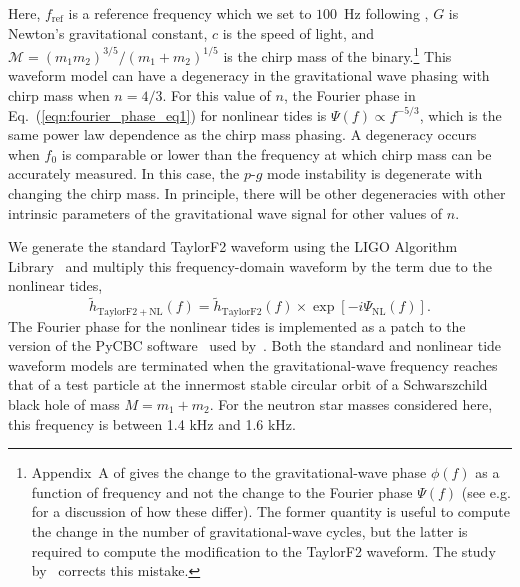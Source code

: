 Here, $f_\mathrm{ref}$ is a reference frequency which we set to $100$~Hz following \cite{Essick:2016tkn}, $G$ is Newton's gravitational constant, $c$ is the speed of light, and $\mathcal{M} = (m_1 m_2)^{3/5}/(m_1+m_2)^{1/5}$ is the chirp mass of the binary.\footnote{Appendix~A of \cite{Essick:2016tkn} gives the change to the gravitational-wave phase $\phi(f)$ as a function of frequency and not the change to the Fourier phase $\Psi(f)$ (see e.g. \cite{Lindblom:2008cm} for a discussion of how these differ). The former quantity is useful to compute the change in the number of gravitational-wave cycles, but the latter is required to compute the modification to the TaylorF2 waveform. The study by~\cite{abbott2019constraining} corrects this mistake.} This waveform model can have a degeneracy in the gravitational wave phasing with chirp mass when $n = 4/3$. For this value of $n$, the Fourier phase in Eq.~(\ref{eqn:fourier_phase_eq1}) for nonlinear tides is $\Psi(f) \propto f^{-5/3}$, which is the same power law dependence as the chirp mass phasing. A degeneracy occurs when $f_0$ is comparable or lower than the frequency at which chirp mass can be accurately measured. In this case, the $p$-$g$ mode instability is degenerate with changing the chirp mass. In principle, there will be other degeneracies with other intrinsic parameters of the gravitational wave signal for other values of $n$.

We generate the standard TaylorF2 waveform using the LIGO Algorithm Library~\citep{lal} and multiply this frequency-domain waveform by the term due to the nonlinear tides,
\begin{equation}
\tilde{h}_\mathrm{TaylorF2+NL}(f) = \tilde{h}_\mathrm{TaylorF2}(f) \times \exp[-i \Psi_\mathrm{NL}(f) ].
\end{equation}
The Fourier phase for the nonlinear tides is implemented as a patch to the version of the PyCBC software~\citep{alex_nitz_2018_1208115} used by~\cite{de2018tidal}. Both the standard and nonlinear tide waveform models are terminated when the gravitational-wave frequency reaches that of a test particle at the innermost stable circular orbit of a Schwarszchild black hole of mass $M = m_1 + m_2$. For the neutron star masses considered here, this frequency is between 1.4 kHz and 1.6 kHz.

